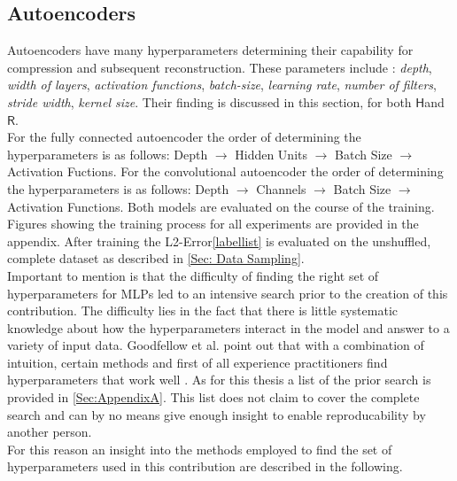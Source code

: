 \documentclass[12pt, a4paper]{article}
\newcommand{\hy}{\(\textsf{H}\)}
\newcommand{\rare}{\(\textsf{R}\)}
\begin{document}
\subsection{Autoencoders}
Autoencoders have many hyperparameters determining their capability for compression and subsequent reconstruction. These parameters include : \textit{depth}, \textit{width of layers}, \textit{activation functions}, \textit{batch-size}, \textit{learning rate}, \textit{number of filters}, \textit{stride width}, \textit{kernel size}. Their finding is discussed in this section, for both \hy and \rare.\\
For the fully connected autoencoder the order of determining the hyperparameters is as follows:
Depth $\rightarrow$ Hidden Units $\rightarrow$ Batch Size $\rightarrow$  Activation Fuctions.
For the convolutional autoencoder the order of determining the hyperparameters is as follows:
Depth $\rightarrow$ Channels $\rightarrow$ Batch Size $\rightarrow$ Activation Functions.
Both models are evaluated on the course of the training. Figures showing the training process for all experiments are provided in the appendix. After training the L2-Error\cref{labellist} is evaluated on the unshuffled, complete dataset as described in \cref{Sec: Data Sampling}.\\
Important to mention is that the difficulty of finding the right set of hyperparameters for MLPs led to an intensive search prior to the creation of this contribution. The difficulty lies in the fact that there is little systematic knowledge about how the hyperparameters interact in the model and answer to a variety of input data. Goodfellow et al. point out that with a combination of intuition, certain methods and first of all experience practitioners find hyperparameters that work well \cite{Goodfellow}. As for this thesis a list of the prior search is provided in \cref{Sec:AppendixA}. This list does not claim to cover the complete search and can by no means give enough insight to enable reproducability by another person.\\
For this reason an insight into the methods employed to find the set of hyperparameters used in this contribution are described in the following. 
\end{document}
